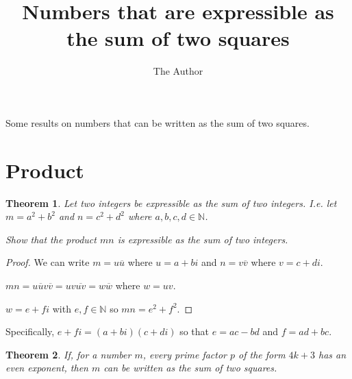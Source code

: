 \documentclass[11pt]{amsart}
\title{Numbers that are expressible as the sum of two squares}
\author{The Author}
\newtheorem{theorem}{Theorem}[section]
\begin{document}
\maketitle


Some results on numbers that can be written as the sum of two squares.


\section{Product}

\begin{theorem}
Let two integers be expressible as the sum of two integers. I.e. let $m = a^2 + b^2$ and $n = c^2 + d^2$ where $a,b,c,d \in \mathbb{N}$.

Show that the product $mn$ is expressible as the sum of two integers.
\end{theorem}

\begin{proof}

We can write $m = u \overline{u}$ where $u = a + b i$ and $n = v \overline{v}$ where $v = c + d i $.

$mn = u \overline{u} v \overline{v} = uv \overline{uv} = w \overline{w}$ where $w = uv$.

$w = e + f i$ with $e,f \in \mathbb{N}$ so $mn = e^2 + f^2$.

\end{proof}

Specifically, $e + f i = (a + b i) ( c + d i)$ so that $e = ac - bd$ and $f = ad + bc$.


\vspace{2em}

\begin{theorem}
If, for a number $m$, every prime factor $p$ of the form $4k+3$ has an even exponent, then $m$ can be written as the sum of two squares.
\end{theorem}
\end{document}
